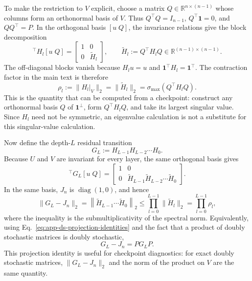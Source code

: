 \documentclass{article}
\begin{document}
To make the restriction to $V$ explicit, choose a matrix
$Q\in\mathbb R^{n\times(n-1)}$ whose columns form an orthonormal basis of
$V$. Thus $Q^\top Q=I_{n-1}$, $Q^\top\mathbf 1=0$, and
$QQ^\top=P$. In the orthogonal basis $[u\;Q]$, the invariance relations
give the block decomposition
\begin{equation}
 [u\;Q]^\top H_l[u\;Q]
 =
 \begin{bmatrix}
  1 & 0\\
  0 & \widetilde H_l
 \end{bmatrix},
 \mspace{36mu}
 \widetilde H_l:=Q^\top H_lQ\in\mathbb R^{(n-1)\times(n-1)}.
 \label{eq:app-ds-block}
\end{equation}
The off-diagonal blocks vanish because $H_lu=u$ and
$\mathbf 1^\top H_l=\mathbf 1^\top$. The contraction factor in the main text is therefore
\begin{equation}
 \rho_l
 :=\|H_l|_V\|_2
 =\|\widetilde H_l\|_2
 =\sigma_{\max}(Q^\top H_lQ).
 \label{eq:app-rho-computable}
\end{equation}
This is the quantity that can be computed from a checkpoint: construct any
orthonormal basis $Q$ of $\mathbf 1^\perp$, form $Q^\top H_lQ$, and take its
largest singular value. Since $H_l$ need not be symmetric, an eigenvalue
calculation is not a substitute for this singular-value calculation.

Now define the depth-$L$ residual transition
\begin{equation}
 G_L:=H_{L-1}H_{L-2}\cdots H_0.
 \label{eq:app-ds-product}
\end{equation}
Because $U$ and $V$ are invariant for every layer, the same orthogonal basis
gives
\begin{equation}
 [u\;Q]^\top G_L[u\;Q]
 =
 \begin{bmatrix}
  1 & 0\\
  0 & \widetilde H_{L-1}\widetilde H_{L-2}\cdots\widetilde H_0
 \end{bmatrix}.
 \label{eq:app-ds-product-block}
\end{equation}
In the same basis, $J_n$ is $\operatorname{diag}(1,0)$, and hence
\begin{equation}
 \|G_L-J_n\|_2
 =
 \left\|\widetilde H_{L-1}\cdots\widetilde H_0\right\|_2
 \leq
 \prod_{l=0}^{L-1}\|\widetilde H_l\|_2
 =
 \prod_{l=0}^{L-1}\rho_l,
 \label{eq:app-ds-product-bound}
\end{equation}
where the inequality is the submultiplicativity of the spectral norm. Equivalently,
using Eq.~\ref{eq:app-ds-projection-identities} and the fact that a product of
doubly stochastic matrices is doubly stochastic,
\begin{equation}
 G_L-J_n=PG_LP.
 \label{eq:app-ds-projected-product}
\end{equation}
This projection identity is useful for checkpoint diagnostics: for exact
doubly stochastic matrices, $\|G_L-J_n\|_2$ and the norm of the product on
$V$ are the same quantity.
\end{document}
